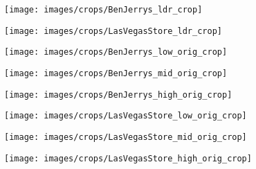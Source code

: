 \documentclass{egpubl}
\begin{document}
\begin{figure*}[htb]
    \centering
    \begin{subfigure}[t]{0.40\linewidth}
        \centering
        \texttt{[image: images/crops/BenJerrys\_ldr\_crop]}
    \end{subfigure}
    \begin{subfigure}[t]{0.40\linewidth}
        \centering
        \texttt{[image: images/crops/LasVegasStore\_ldr\_crop]}
    \end{subfigure}

    \begin{subfigure}[t]{0.13\linewidth}
        \centering
        \texttt{[image: images/crops/BenJerrys\_low\_orig\_crop]}
    \end{subfigure}
    \begin{subfigure}[t]{0.13\linewidth}
        \centering
        \texttt{[image: images/crops/BenJerrys\_mid\_orig\_crop]}
    \end{subfigure}
    \begin{subfigure}[t]{0.13\linewidth}
        \centering
        \texttt{[image: images/crops/BenJerrys\_high\_orig\_crop]}
    \end{subfigure}
    \begin{subfigure}[t]{0.13\linewidth}
        \centering
        \texttt{[image: images/crops/LasVegasStore\_low\_orig\_crop]}
    \end{subfigure}
    \begin{subfigure}[t]{0.13\linewidth}
        \centering
        \texttt{[image: images/crops/LasVegasStore\_mid\_orig\_crop]}
    \end{subfigure}
    \begin{subfigure}[t]{0.13\linewidth}
        \centering
        \texttt{[image: images/crops/LasVegasStore\_high\_orig\_crop]}
    \end{subfigure}


\end{figure*}
\end{document}

